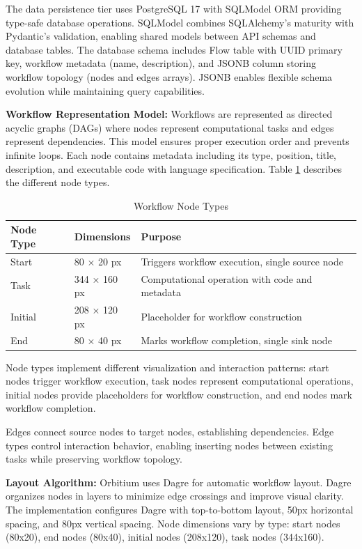 \documentclass[12pt]{article}
\begin{document}
The data persistence tier uses PostgreSQL 17 with SQLModel ORM providing type-safe database operations. SQLModel combines SQLAlchemy's maturity with Pydantic's validation, enabling shared models between API schemas and database tables. The database schema includes Flow table with UUID primary key, workflow metadata (name, description), and JSONB column storing workflow topology (nodes and edges arrays). JSONB enables flexible schema evolution while maintaining query capabilities.

\hspace{\parindent}\textbf{Workflow Representation Model:} Workflows are represented as directed acyclic graphs (DAGs) where nodes represent computational tasks and edges represent dependencies. This model ensures proper execution order and prevents infinite loops. Each node contains metadata including its type, position, title, description, and executable code with language specification. Table \ref{tab:node_types} describes the different node types.

\begin{table}[h]
\centering
\caption{Workflow Node Types}
\label{tab:node_types}
\begin{tabular}{|l|l|p{6cm}|}
\hline
\textbf{Node Type} & \textbf{Dimensions} & \textbf{Purpose} \\
\hline
Start & 80 × 20 px & Triggers workflow execution, single source node \\
Task & 344 × 160 px & Computational operation with code and metadata \\
Initial & 208 × 120 px & Placeholder for workflow construction \\
End & 80 × 40 px & Marks workflow completion, single sink node \\
\hline
\end{tabular}
\end{table}

Node types implement different visualization and interaction patterns: start nodes trigger workflow execution, task nodes represent computational operations, initial nodes provide placeholders for workflow construction, and end nodes mark workflow completion.

Edges connect source nodes to target nodes, establishing dependencies. Edge types control interaction behavior, enabling inserting nodes between existing tasks while preserving workflow topology.

\hspace{\parindent}\textbf{Layout Algorithm:} Orbitium uses Dagre for automatic workflow layout. Dagre organizes nodes in layers to minimize edge crossings and improve visual clarity. The implementation configures Dagre with top-to-bottom layout, 50px horizontal spacing, and 80px vertical spacing. Node dimensions vary by type: start nodes (80x20), end nodes (80x40), initial nodes (208x120), task nodes (344x160).
\end{document}
